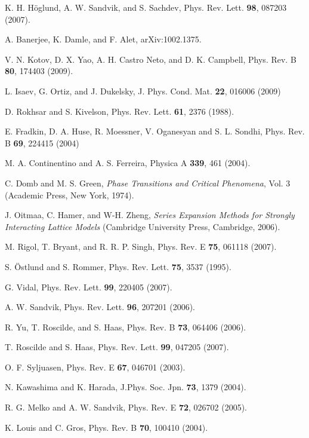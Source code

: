 \documentclass[draft,numberedheadings]{aipproc}
\begin{document}
\begin{thebibliography}{999}
K. H. H\"oglund, A. W. Sandvik, and S. Sachdev, Phys. Rev. Lett. {\bf 98}, 087203 (2007).

A. Banerjee, K. Damle, and F. Alet, arXiv:1002.1375.

V. N. Kotov, D. X. Yao, A. H. Castro Neto, and D. K. Campbell, Phys. Rev. B {\bf 80}, 174403 (2009).

L. Isaev, G. Ortiz, and J. Dukelsky, J. Phys. Cond. Mat. {\bf 22}, 016006 (2009)

D.  Rokhsar and S. Kivelson, Phys. Rev. Lett. \textbf{61}, 2376 (1988).

E. Fradkin, D. A. Huse, R. Moessner, V. Oganesyan and S. L. Sondhi, Phys. Rev. B {\bf 69}, 224415 (2004)

M. A. Continentino and A. S. Ferreira, Physica A {\bf 339}, 461 (2004).

C. Domb and M. S. Green, {\it Phase Transitions and Critical Phenomena}, 
Vol. 3 (Academic Press, New York, 1974).

J. Oitmaa, C. Hamer, and W-H. Zheng, {\it Series Expansion Methods for Strongly Interacting 
Lattice Models} (Cambridge University Press, Cambridge, 2006).

M. Rigol, T. Bryant, and R. R. P. Singh, Phys. Rev. E {\bf 75}, 061118 (2007).

S. \"Ostlund and S. Rommer, Phys. Rev. Lett. {\bf 75}, 3537 (1995).

G. Vidal, Phys. Rev. Lett. {\bf 99}, 220405 (2007). 

A. W. Sandvik, Phys. Rev. Lett. {\bf 96}, 207201 (2006).

R. Yu, T. Roscilde, and S. Haas, Phys. Rev. B {\bf 73}, 064406 (2006).

T. Roscilde and S. Haas, Phys. Rev. Lett. {\bf 99}, 047205 (2007). 

O. F. Syljuasen, Phys. Rev. E {\bf 67}, 046701 (2003). 

N. Kawashima and K. Harada, J.Phys. Soc. Jpn. {\bf 73}, 1379 (2004).

R. G. Melko and A. W. Sandvik, Phys. Rev. E {\bf 72}, 026702 (2005).

K. Louis and C. Gros, Phys. Rev. B {\bf 70}, 100410 (2004).


\end{thebibliography}
\end{document}
